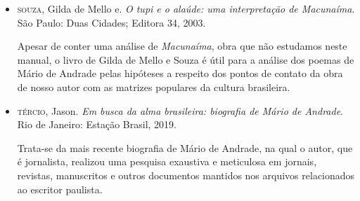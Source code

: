 \documentclass[11pt]{extarticle}
\begin{document}
\begin{itemize}
\item \textsc{souza}, Gilda de Mello e. \emph{O tupi e o alaúde: uma interpretação de
\emph{Macunaíma}}. São Paulo: Duas Cidades; Editora 34, 2003.

Apesar de conter uma análise de \emph{Macunaíma}, obra que não estudamos
neste manual, o livro de Gilda de Mello e Souza é útil para a análise
dos poemas de Mário de Andrade pelas hipóteses a respeito dos pontos de
contato da obra de nosso autor com as matrizes populares da cultura
brasileira.

\item \textsc{tércio}, Jason. \emph{Em busca da alma brasileira: biografia de Mário
de Andrade}. Rio de Janeiro: Estação Brasil, 2019.

Trata-se da mais recente biografia de Mário de Andrade, na qual o autor,
que é jornalista, realizou uma pesquisa exaustiva e meticulosa em
jornais, revistas, manuscritos e outros documentos mantidos nos arquivos
relacionados ao escritor paulista.

\end{itemize}
\end{document}
